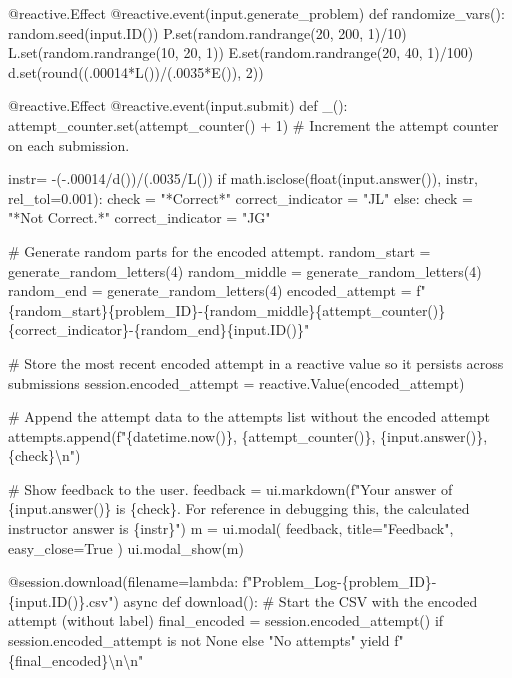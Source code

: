 \documentclass[
  letterpaper,
  DIV=11,
  numbers=noendperiod]{scrreprt}
\newenvironment{Shaded}{\begin{snugshade}}{\end{snugshade}}
\newcommand{\NormalTok}[1]{\textcolor[rgb]{0.00,0.23,0.31}{#1}}
\begin{document}
\begin{Shaded}
\begin{Highlighting}[]
\NormalTok{    @reactive.Effect}
\NormalTok{    @reactive.event(input.generate\_problem)}
\NormalTok{    def randomize\_vars():}
\NormalTok{        random.seed(input.ID())}
\NormalTok{        P.set(random.randrange(20, 200, 1)/10)}
\NormalTok{        L.set(random.randrange(10, 20, 1))}
\NormalTok{        E.set(random.randrange(20, 40, 1)/100)}
\NormalTok{        d.set(round((.00014*L())/(.0035*E()), 2))}
        
\NormalTok{    @reactive.Effect}
\NormalTok{    @reactive.event(input.submit)}
\NormalTok{    def \_():}
\NormalTok{        attempt\_counter.set(attempt\_counter() + 1)  \# Increment the attempt counter on each submission.}
       
\NormalTok{        instr= {-}({-}.00014/d())/(.0035/L())}
\NormalTok{        if math.isclose(float(input.answer()), instr, rel\_tol=0.001):}
\NormalTok{            check = "*Correct*"}
\NormalTok{            correct\_indicator = "JL"}
\NormalTok{        else:}
\NormalTok{            check = "*Not Correct.*"}
\NormalTok{            correct\_indicator = "JG"}

\NormalTok{        \# Generate random parts for the encoded attempt.}
\NormalTok{        random\_start = generate\_random\_letters(4)}
\NormalTok{        random\_middle = generate\_random\_letters(4)}
\NormalTok{        random\_end = generate\_random\_letters(4)}
\NormalTok{        encoded\_attempt = f"\{random\_start\}\{problem\_ID\}{-}\{random\_middle\}\{attempt\_counter()\}\{correct\_indicator\}{-}\{random\_end\}\{input.ID()\}"}

\NormalTok{        \# Store the most recent encoded attempt in a reactive value so it persists across submissions}
\NormalTok{        session.encoded\_attempt = reactive.Value(encoded\_attempt)}

\NormalTok{        \# Append the attempt data to the attempts list without the encoded attempt}
\NormalTok{        attempts.append(f"\{datetime.now()\}, \{attempt\_counter()\}, \{input.answer()\}, \{check\}\textbackslash{}n")}

\NormalTok{        \# Show feedback to the user.}
\NormalTok{        feedback = ui.markdown(f"Your answer of \{input.answer()\} is \{check\}. For reference in debugging this, the calculated instructor answer is \{instr\}")}
\NormalTok{        m = ui.modal(}
\NormalTok{            feedback,}
\NormalTok{            title="Feedback",}
\NormalTok{            easy\_close=True}
\NormalTok{        )}
\NormalTok{        ui.modal\_show(m)}

\NormalTok{    @session.download(filename=lambda: f"Problem\_Log{-}\{problem\_ID\}{-}\{input.ID()\}.csv")}
\NormalTok{    async def download():}
\NormalTok{        \# Start the CSV with the encoded attempt (without label)}
\NormalTok{        final\_encoded = session.encoded\_attempt() if session.encoded\_attempt is not None else "No attempts"}
\NormalTok{        yield f"\{final\_encoded\}\textbackslash{}n\textbackslash{}n"}
        

\end{Highlighting}
\end{Shaded}
\end{document}
